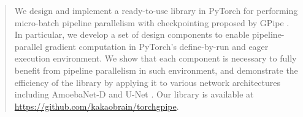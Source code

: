 \documentclass[10pt,twocolumn,letterpaper]{article}
\begin{document}
\maketitle

\begin{abstract}
We design and implement a ready-to-use library in PyTorch for performing micro-batch pipeline parallelism with checkpointing proposed by GPipe \cite{huang2019gpipe}. In particular, we develop a set of design components to enable pipeline-parallel gradient computation in PyTorch's define-by-run and eager execution environment. We show that each component is necessary to fully benefit from pipeline parallelism in such environment, and demonstrate the efficiency of the library by applying it to various network architectures including AmoebaNet-D \cite{real2019regularized} and U-Net \cite{RonnebergerFB15}. Our library is available at \url{https://github.com/kakaobrain/torchgpipe}.
\end{abstract}








{\small


}
\end{document}
